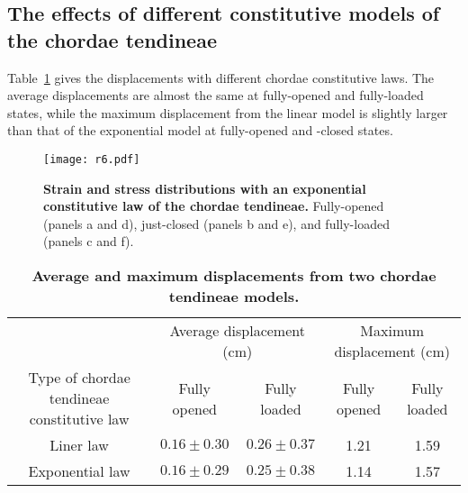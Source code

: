 \documentclass[fleqn,10pt]{wlscirep}
\begin{document}


\subsection*{The effects of different constitutive models of the chordae tendineae}

Table~\ref{tab:MML2} gives the displacements with different chordae constitutive laws. The average displacements are almost the same at fully-opened and  fully-loaded states, while the maximum displacement from the linear model is slightly larger than that of the exponential model at fully-opened and -closed states.

\begin{figure}[!h]
	\centering
    \texttt{[image: r6.pdf]}
	\renewcommand{\figurename}{Figure}
	\caption{{\bf Strain and stress distributions with an exponential constitutive law of the chordae tendineae.} Fully-opened (panels a and d), just-closed (panels b and e), and fully-loaded (panels c and f).}
	\label{SEA12}\quad
\end{figure}

\begin{table}[!h]
	\centering
	\caption{\bf Average and maximum displacements from two chordae tendineae models.}
	\label{tab:MML2}
	\begin{tabular}{ccccc}
		\hline
		& \multicolumn{2}{c}{Average displacement (cm)}& \multicolumn{2}{c}{Maximum displacement (cm)}\\\cline{2-5}
		Type of chordae tendineae constitutive law &Fully opened&Fully loaded&Fully opened&Fully loaded\\
		\hline
		Liner law & $0.16 \pm 0.30$ & $0.26 \pm 0.37$ & 1.21 & 1.59\\
		Exponential law & $0.16 \pm 0.29$ & $0.25 \pm 0.38$ & 1.14 & 1.57 \\
		\hline
	\end{tabular}
\end{table}
\end{document}
